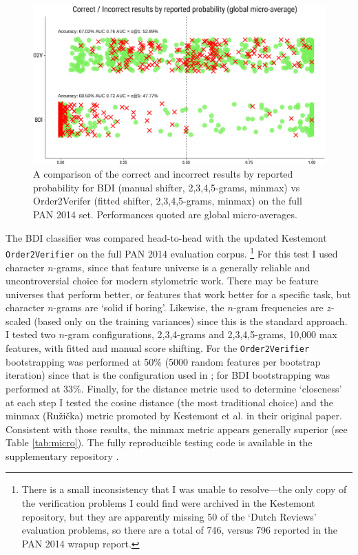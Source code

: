 \documentclass[
    hf
]{ceurart}
\begin{document}
\begin{figure}
    \includegraphics[width=\linewidth]{figures/bdi_o2v-crop.pdf}
    \caption{A comparison of the correct and incorrect results by reported probability for BDI
        (manual shifter, 2,3,4,5-grams, minmax) vs Order2Verifer (fitted shifter, 2,3,4,5-grams,
        minmax) on the full PAN 2014 set. Performances quoted are global micro-averages.}
    \label{fig:bdi_o2v}
\end{figure}


The BDI classifier was compared head-to-head with the updated Kestemont \texttt{Order2Verifier} on
the full PAN 2014 evaluation corpus.%
%
\footnote{ There is a small inconsistency that I was unable to resolve---the only copy of the
    verification problems I could find were archived in the Kestemont repository, but they are
    apparently missing 50 of the `Dutch Reviews' evaluation problems, so there are a total of 746,
    versus 796 reported in the PAN 2014 wrapup report. }
%
For this test I used character $n$-grams, since that feature universe is a generally reliable and
uncontroversial choice for modern stylometric work. There may be feature universes that perform
better, or features that work better for a specific task, but character $n$-grams are `solid if
boring'. Likewise, the $n$-gram frequencies are $z$-scaled (based only on the training variances)
since this is the standard approach. I tested two $n$-gram configurations, 2,3,4-grams and
2,3,4,5-grams, 10,000 max features, with fitted and manual score shifting. For the
\texttt{Order2Verifier} bootstrapping was performed at 50\% (5000 random features per bootstrap
iteration) since that is the configuration used in \cite{kestemont_caesar}; for BDI bootstrapping
was performed at 33\%. Finally, for the distance metric used to determine `closeness' at each step I
tested the cosine distance (the most traditional choice) and the minmax (Ružička) metric promoted by
Kestemont et al. in their original paper. Consistent with those results, the minmax metric appears
generally superior (see Table \ref{tab:micro}). The fully reproducible testing code is available in
the supplementary repository \cite{nagy_bdi_2024}.
\end{document}
